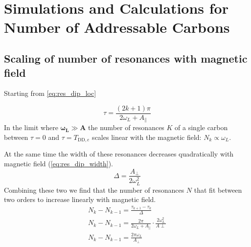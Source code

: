 \chapter{Simulations and Calculations for Number of Addressable Carbons}
\label{chap:addressable_carbon_sims}

\section{Scaling of number of resonances with magnetic field}
Starting from \cref{eq:res_dip_loc}

\begin{equation}
    \tau = \frac{(2k+1)\pi}{2\omega_L+A_\parallel}
\end{equation}
In the limit where $\bm{\omega_L} \gg \bm{A}$ the number of resonances $K$ of a single carbon between $\tau = 0$ and $\tau = T_{\mathrm{DD},e}$ scales linear with the magnetic field: $N_k \propto \omega_L$.

At the same time the width of these resonances decreases quadratically with magnetic field (\cref{eq:res_dip_width}).
\begin{equation}
    \Delta = \frac{A_\perp }{2\omega_L^2}
\end{equation}
Combining these two we find that the number of resonances $N$ that fit between two orders to increase linearly with magnetic field.
\begin{align}
N_k -N_{k-1} = \frac{\tau_{k+1} -\tau_k} {\Delta} \\
N_k -N_{k-1} = \frac{2\pi}{2\omega_L +A_\parallel} \cdot \frac{2\omega_L ^2}{A\perp}\\
N_k -N_{k-1} = \frac{2\pi \omega_L}{A_\perp }
\end{align}



